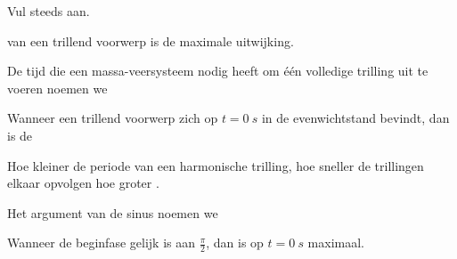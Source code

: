 \documentclass{ximera}
\begin{document}
    \author{Ingmar Herreman}
    \date{Januari 2024}
    
\begin{exercise} 
	Vul steeds aan.

	\begin{question}

van een trillend voorwerp is de maximale uitwijking.

	\end{question}

	\begin{question}
		De tijd die een massa-veersysteem nodig heeft om één volledige trilling uit te voeren noemen we 

	\end{question}


	\begin{question}
		Wanneer een trillend voorwerp zich op $t=0 \ s$ in de evenwichtstand bevindt, dan is de 

	\end{question}


	\begin{question}
		Hoe kleiner de periode van een harmonische trilling, hoe sneller de trillingen elkaar opvolgen hoe groter .

	\end{question}

	\begin{question} 
		Het argument van de sinus noemen we 

	\end{question}

		\begin{question}
			Wanneer de beginfase gelijk is aan $\frac{\pi}{2}$, dan is  op $t=0 \ s$ maximaal.

		\end{question}
\end{exercise}
\end{document}
